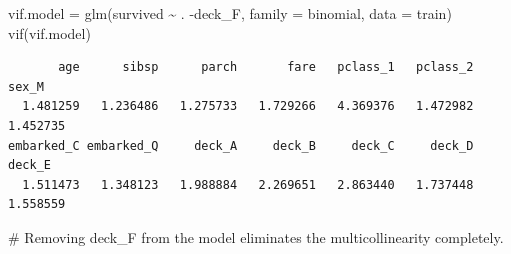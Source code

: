 \documentclass[
  letterpaper,
  DIV=11,
  numbers=noendperiod]{scrartcl}
\newenvironment{Shaded}{\begin{snugshade}}{\end{snugshade}}
\newcommand{\AttributeTok}[1]{\textcolor[rgb]{0.40,0.45,0.13}{#1}}
\newcommand{\CommentTok}[1]{\textcolor[rgb]{0.37,0.37,0.37}{#1}}
\newcommand{\FunctionTok}[1]{\textcolor[rgb]{0.28,0.35,0.67}{#1}}
\newcommand{\NormalTok}[1]{\textcolor[rgb]{0.00,0.23,0.31}{#1}}
\newcommand{\OtherTok}[1]{\textcolor[rgb]{0.00,0.23,0.31}{#1}}
\newcommand{\SpecialCharTok}[1]{\textcolor[rgb]{0.37,0.37,0.37}{#1}}
\begin{document}
\begin{Shaded}
\begin{Highlighting}[]
\NormalTok{vif.model }\OtherTok{=} \FunctionTok{glm}\NormalTok{(survived }\SpecialCharTok{\textasciitilde{}}\NormalTok{ . }\SpecialCharTok{{-}}\NormalTok{deck\_F, }\AttributeTok{family =}\NormalTok{ binomial, }\AttributeTok{data =}\NormalTok{ train)}
\FunctionTok{vif}\NormalTok{(vif.model)}
\end{Highlighting}
\end{Shaded}

\begin{verbatim}
       age      sibsp      parch       fare   pclass_1   pclass_2      sex_M 
  1.481259   1.236486   1.275733   1.729266   4.369376   1.472982   1.452735 
embarked_C embarked_Q     deck_A     deck_B     deck_C     deck_D     deck_E 
  1.511473   1.348123   1.988884   2.269651   2.863440   1.737448   1.558559 
\end{verbatim}

\begin{Shaded}
\begin{Highlighting}[]
\CommentTok{\# Removing deck\_F from the model eliminates the multicollinearity completely. }
\end{Highlighting}
\end{Shaded}
\end{document}
